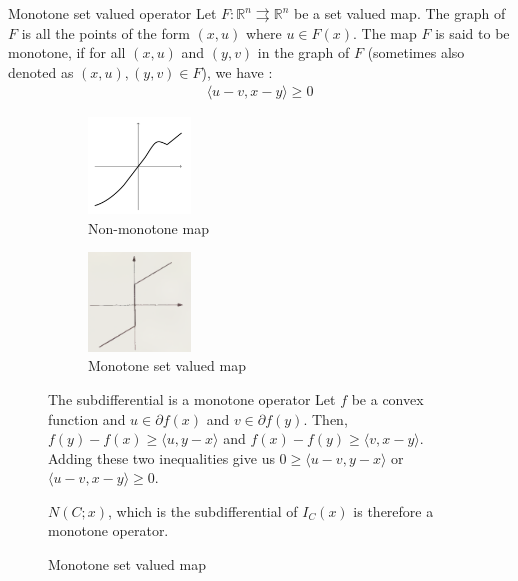 \documentclass[8pt,aspectratio=169]{beamer}
\begin{document}
\begin{frame}[fragile]{Monotone set valued operator}
    Let $F : \mathbb{R}^n \rightrightarrows \mathbb{R}^n$ be a set valued map. The graph of $F$ is all the points of the form $(x, u)$ where $u \in F(x)$. The map $F$ is said to be monotone, if for all $(x, u)$ and $(y, v)$ in the graph of $F$ (sometimes also denoted as $(x, u), (y, v) \in F$), we have : 
    \begin{align*}
        \langle u-v, x-y \rangle \geq 0
    \end{align*} 
    
    \begin{figure}[h]
     \centering
     \begin{subfigure}[b]{0.4\textwidth}
         \centering
         \includegraphics[width=0.3\textwidth]{nonmono.png}
         \caption{Non-monotone map}
         \label{fig:y equals x}
     \end{subfigure}
     \hfill
     \begin{subfigure}[b]{0.4\textwidth}
         \centering
         \includegraphics[width=0.3\textwidth]{monotone.png}
         \caption{Monotone set valued map}
         \label{fig:three sin x}
     \end{subfigure}

     \begin{block}{The subdifferential is a monotone operator}
        Let $f$ be a convex function and $u \in  \partial f(x)$ and $v \in \partial f(y)$. Then, $f(y) - f(x) \geq \langle u, y-x\rangle$ and $f(x) - f(y) \geq \langle v, x - y \rangle$. Adding these two inequalities give us $0 \geq \langle u-v, y-x\rangle$ or $\langle u-v, x -y \rangle \geq 0$.\\
         
     \end{block}

     $N(C; x)$, which is the subdifferential of $I_C(x)$ is therefore a monotone operator.
\end{figure}
\end{frame}
\end{document}
